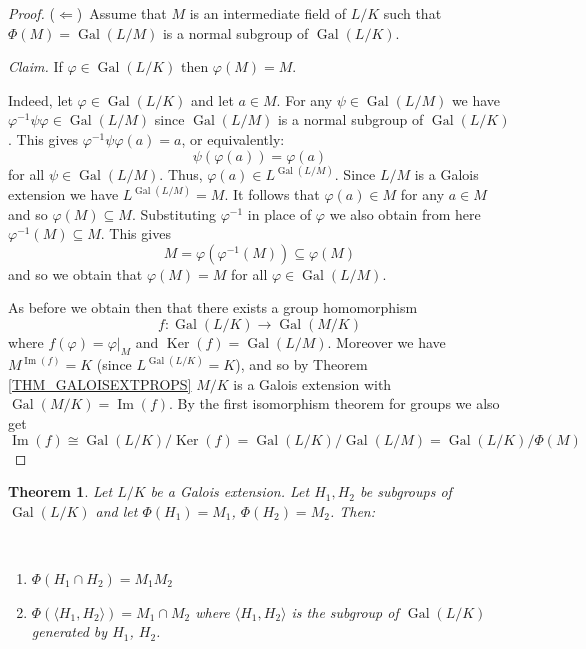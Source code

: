 \documentclass[12pt, letterpaper, oneside]{article}
\theoremstyle{plain}
\newtheorem{theorem}{Theorem}[section]
\theoremstyle{definition}
\renewcommand{\Im}{\operatorname{Im}}
\newcommand{\Ker}{\operatorname{Ker}}
\newcommand{\subgp}[1]{\langle#1\rangle}
\newcommand{\Gal}{\operatorname{Gal}}
\newcommand{\benu}{\begin{enumerate}}
\newcommand{\eenu}{\end{enumerate}}
\newcommand{\vs}{\vskip 5mm}
\begin{document}
\begin{proof}
\vs\vs

($\Leftarrow$)\ Assume that $M$ is an intermediate field of $L/K$ 
such that $\Phi(M)= \Gal(L/M)$ is a normal subgroup of $\Gal(L/K)$.  
 
 \emph{Claim.} If $\varphi \in \Gal(L/K)$ then $\varphi(M) = M$.
 
 
 Indeed, let $\varphi\in \Gal(L/K)$ and let $a\in M$. For any $\psi\in \Gal(L/M)$ we have 
 $\varphi^{-1}\psi\varphi \in \Gal(L/M)$ since $\Gal(L/M)$ is a normal subgroup of $\Gal(L/K)$. 
 This gives $\varphi^{-1}\psi\varphi(a) = a$, or equivalently:
 $$\psi(\varphi(a)) = \varphi(a)$$
 for all $\psi\in \Gal(L/M)$. Thus, $\varphi(a)\in L^{\Gal(L/M)}$. Since $L/M$ is a Galois extension 
 we have $ L^{\Gal(L/M)} = M$. It follows that  $\varphi(a)\in M$ for any $a\in M$ and so 
 $\varphi(M)\subseteq M$.  Substituting $\varphi^{-1}$ in place of $\varphi$ we also obtain from 
 here $\varphi^{-1}(M) \subseteq M$. This gives 
 $$M = \varphi(\varphi^{-1}(M)) \subseteq \varphi(M)$$
 and so we obtain that $\varphi(M) = M$ for all $\varphi\in \Gal(L/M)$.
 
 As before we obtain then that there exists a group homomorphism 
 $$f\colon \Gal(L/K) \to \Gal(M/K)$$
where  $f(\varphi) = \varphi|_{M}$ and $\Ker(f) = \Gal(L/M)$. 
Moreover we have $M^{\Im(f)}= K$ (since $L^{\Gal(L/K)}= K$), and so by 
Theorem \ref{THM_GALOISEXTPROPS} $M/K$ is a Galois extension
with $\Gal(M/K) = \Im(f)$. By the first isomorphism theorem for groups we also get 
$$\Im(f) \cong \Gal(L/K)/\Ker(f) = \Gal(L/K)/\Gal(L/M) = \Gal(L/K)/ \Phi(M)$$ 
 
 
 

\end{proof}



\vs\vs

\begin{theorem}
Let $L/K$ be a Galois extension.  Let $H_{1}, H_{2}$ be subgroups of $\Gal(L/K)$ and let
$\Phi(H_{1}) = M_{1}$, $\Phi(H_{2}) = M_{2}$. Then:

\vskip -13mm

\ 
\benu
\item[1)]  $\Phi(H_{1}\cap H_{2}) = M_{1}M_{2}$
\item[2)]  $\Phi(\subgp{H_{1}, H_{2}})  = M_{1}\cap M_{2}$ where $\subgp{H_{1}, H_{2}}$ is the 
subgroup of $\Gal(L/K)$ generated by $H_{1}$, $H_{2}$. 
\eenu 
 
\end{theorem}


\vs 
\end{document}

